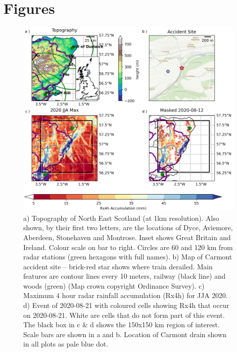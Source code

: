 \documentclass[11pt,a4paper]{article}
\begin{document}
\section*{Figures}
\begin{figure}[ht!] %
	
	\centering
	\includegraphics[width=\linewidth]{carmont_geog_group}
	\caption{a) Topography of North East Scotland (at 1km resolution). Also shown, by their first two letters, are the locations of Dyce, Aviemore, Aberdeen, Stonehaven and Montrose. Inset shows Great Britain and Ireland. Colour scale on bar to right. Circles are  60 and 120 km from radar stations (green hexagons with full names). b)  Map of Carmont accident site -- brick-red star shows where train derailed. Main features are contour lines every 10 meters, railway (black line) and woods (green) (Map crown copyright Ordinance Survey).  c) Maximum 4 hour radar rainfall accumulation (Rx4h)  for JJA 2020. d) Event of 2020-08-21 with coloured cells showing Rx4h that occur on 2020-08-21.  White are cells that do not form part of this event.  The black box in c \& d shows the 150x150 km region of interest. Scale bars are shown in a and b. Location of Carmont drain shown in all plots as pale blue dot.  }
	\label{fig:carmont_geog_group}
\end{figure}
\clearpage
\end{document}
